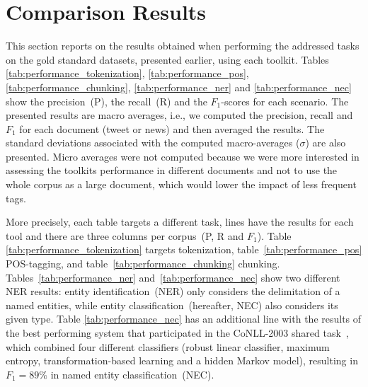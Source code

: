 \section{Comparison Results}

This section reports on the results obtained when performing the addressed tasks on the gold standard datasets, presented earlier, using each toolkit.
Tables \ref{tab:performance_tokenization}, \ref{tab:performance_pos}, \ref{tab:performance_chunking}, \ref{tab:performance_ner} and \ref{tab:performance_nec} show the precision~(P), the recall~(R) and the $F_1$-scores for each scenario.
The presented results are macro averages, i.e., we computed the precision, recall and $F_1$ for each document (tweet or news) and then averaged the results. The standard deviations associated with the computed macro-averages ($\sigma$) are also presented. 
Micro averages were not computed because we were more interested in assessing the toolkits performance in different documents and not to use the whole corpus as a large document, which would lower the impact of less frequent tags.

More precisely, each table targets a different task, lines have the results for each tool and there are three columns per corpus~(P, R and $F_1$).
Table \ref{tab:performance_tokenization} targets tokenization, table~\ref{tab:performance_pos} POS-tagging, and table~\ref{tab:performance_chunking} chunking.
Tables~\ref{tab:performance_ner} and~\ref{tab:performance_nec} show two different NER results: entity identification~(NER) only considers the delimitation of a named entities, while entity classification~(hereafter, NEC) also considers its given type.
Table \ref{tab:performance_nec} has an additional line with the results of the best performing system that participated in the CoNLL-2003 shared task~\cite{FlorianConll2003}, which combined four different classifiers (robust linear classifier, maximum  entropy, transformation-based learning and a hidden Markov model), resulting in $F_1=89\%$ in named entity classification~(NEC). 


